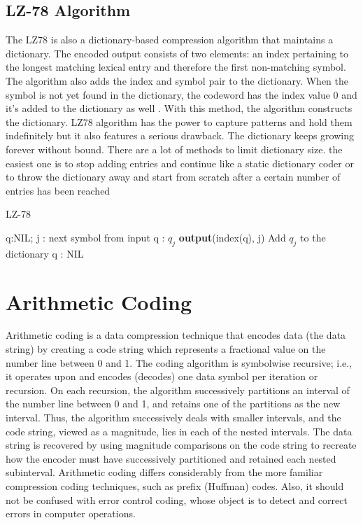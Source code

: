 \documentclass{article}
\begin{document}
\subsection{LZ-78 Algorithm}
The LZ78 is also a dictionary-based compression algorithm that maintains a dictionary. The encoded output
consists of two elements: an index pertaining to the longest matching lexical entry and therefore the first non-matching
symbol. The algorithm also adds the index and symbol pair to the dictionary. When the symbol is not yet found in
the dictionary, the codeword has the index value 0 and it's added to the dictionary as well . With this method, the
algorithm constructs the dictionary.
LZ78 algorithm has the power to capture patterns and hold them indefinitely but it also features a serious drawback.
The dictionary keeps growing forever without bound. There are a lot of methods to limit dictionary size. the
easiest one is to stop adding entries and continue like a static dictionary coder or to throw the dictionary away and
start from scratch after a certain number of entries has been reached\cite{zeeh2003lempel}

\begin{algorithm}
	\caption{LZ-78}
	\begin{algorithmic}[0]
		\STATE q:NIL;
		\STATE j : next symbol from input
			\STATE q : $q_j$
		\ELSE
			\STATE \textbf{output}(index(q), j)		
			\STATE Add $q_j$ to the dictionary
			\STATE q : NIL
		\ENDIF
		\ENDWHILE

	\end{algorithmic}
\end{algorithm}



\section{Arithmetic Coding}

Arithmetic coding \cite{witten1987arithmetic} is a data compression technique that encodes data (the data string) by creating a code string which represents a fractional value on the number line between 0 and 1. The coding algorithm is symbolwise recursive; i.e., it operates upon and encodes (decodes) one data symbol per iteration or recursion. On each recursion, the algorithm successively partitions an interval of the number line between 0 and 1, and retains one of the partitions as the new interval. Thus, the algorithm successively deals with smaller intervals, and the code string, viewed as a magnitude, lies in each of the nested intervals. The data string is recovered by using magnitude comparisons on the code string to recreate how the encoder must have successively partitioned and retained each nested subinterval. Arithmetic coding differs considerably from the more familiar compression coding techniques, such as prefix (Huffman) codes. Also, it should not be confused with error control coding, whose object is to detect and correct errors in computer operations.\cite{rissanen1979arithmetic} \cite{langdon1984introduction}
\end{document}
